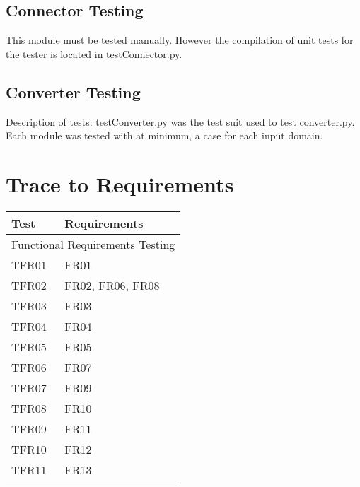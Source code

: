 \documentclass[12pt, titlepage]{article}
\begin{document}
	\subsection{Connector Testing}
		This module must be tested manually. However the compilation of unit tests for the tester is located in testConnector.py.
	\subsection{Converter Testing}
        Description of tests: testConverter.py was the test suit used to test converter.py. Each module was tested with at minimum, a case for each input domain. 

\section{Trace to Requirements}
		\begin{table}[!htbp]
			\begin{tabular}{ll}
				\toprule
				Test & Requirements \\
				\midrule
				\multicolumn{2}{c}{Functional Requirements Testing} \\
				\midrule
                TFR01 & FR01 \\
                TFR02 & FR02, FR06, FR08 \\
                TFR03 & FR03 \\
                TFR04 & FR04 \\
                TFR05 & FR05 \\
                TFR06 & FR07 \\
                TFR07 & FR09 \\
                TFR08 & FR10 \\
                TFR09 & FR11 \\
                TFR10 & FR12 \\
                TFR11 & FR13 \\
 
 				\bottomrule
			\end{tabular}
			\makeatletter
			\def\rulecolor#1#{\CT@arc{#1}}
			\def\CT@arc#1#2{%
				\ifdim\baselineskip=\z@\noalign\fi
				{\gdef\CT@arc@{\color#1{#2}}}}
			\let\CT@arc@\relax
			\makeatother
			\label{Table}
		\end{table}
		
		\FloatBarrier
                
\end{document}
